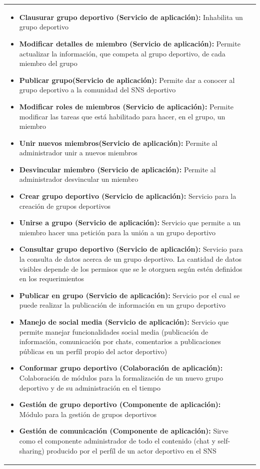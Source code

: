 \begin{table}[!htb]
\begin{center}
{\begin{tabular}{|p{7cm}|p{4cm}|}
\begin{itemize}
				\item \textbf{Clausurar grupo deportivo (Servicio de aplicación):} Inhabilita un grupo deportivo
				\item \textbf{Modificar detalles de miembro (Servicio de aplicación):} Permite actualizar la información, que competa al grupo deportivo, de cada miembro del grupo
				\item \textbf{Publicar grupo(Servicio de aplicación):} Permite dar a conocer al grupo deportivo a la comunidad del SNS deportivo
				\item \textbf{Modificar roles de miembros (Servicio de aplicación):} Permite modificar las tareas que está habilitado para hacer, en el grupo, un miembro
				\item \textbf{Unir nuevos miembros(Servicio de aplicación):} Permite al administrador unir a nuevos miembros
				\item \textbf{Desvincular miembro (Servicio de aplicación):} Permite al administrador desvincular un miembro
				\item \textbf{Crear grupo deportivo (Servicio de aplicación):} Servicio para la creación de grupos deportivos
				\item \textbf{Unirse a grupo (Servicio de aplicación):} Servicio que permite a un miembro hacer una petición para la unión a un grupo deportivo
				\item \textbf{Consultar grupo deportivo (Servicio de aplicación):} Servicio para la consulta de datos acerca de un grupo deportivo. La cantidad de datos visibles depende de los permisos que se le otorguen según estén definidos en los requerimientos
				\item \textbf{Publicar en grupo (Servicio de aplicación):} Servicio por el cual se puede realizar la publicación de información en un grupo deportivo
				\item \textbf{Manejo de social media (Servicio de aplicación):} Servicio que permite manejar funcionalidades social media (publicación de información, comunicación por chats, comentarios a publicaciones públicas en un perfíl propio del actor deportivo)
				\item \textbf{Conformar grupo deportivo (Colaboración de aplicación):} Colaboración de módulos para la formalización de un nuevo grupo deportivo y de su administración en el tiempo
				\item \textbf{Gestión de grupo deportivo (Componente de aplicación):} Módulo para la gestión de grupos deportivos
				\item \textbf{Gestión de comunicación (Componente de aplicación):} Sirve como el componente administrador de todo el contenido (chat y self-sharing) producido por el perfíl de un actor deportivo en el SNS 

\end{itemize}
\end{tabular}}
\end{center}
\end{table}
